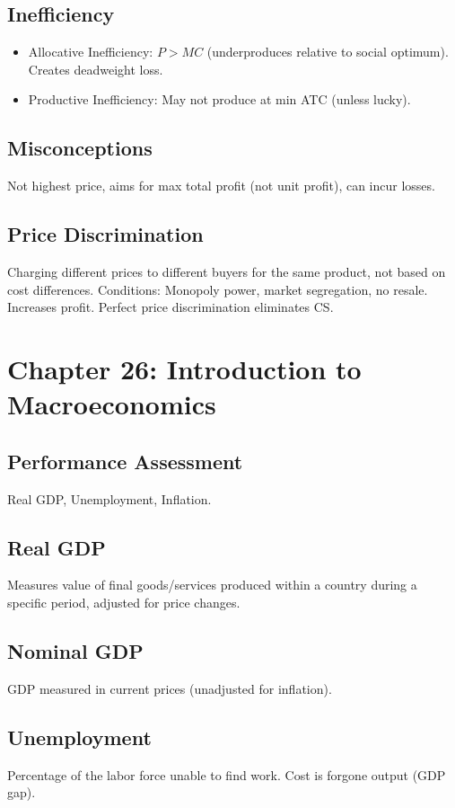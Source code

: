 \documentclass{article}
\begin{document}
\subsection*{Inefficiency}
\begin{itemize}
    \item Allocative Inefficiency: $P > MC$ (underproduces relative to social optimum). Creates deadweight loss.
    \item Productive Inefficiency: May not produce at min ATC (unless lucky).
\end{itemize}

\subsection*{Misconceptions}
Not highest price, aims for max total profit (not unit profit), can incur losses.

\subsection*{Price Discrimination}
Charging different prices to different buyers for the same product, not based on cost differences. Conditions: Monopoly power, market segregation, no resale. Increases profit. Perfect price discrimination eliminates CS.

\section*{Chapter 26: Introduction to Macroeconomics}

\subsection*{Performance Assessment}
Real GDP, Unemployment, Inflation.

\subsection*{Real GDP}
Measures value of final goods/services produced within a country during a specific period, adjusted for price changes.

\subsection*{Nominal GDP}
GDP measured in current prices (unadjusted for inflation).

\subsection*{Unemployment}
Percentage of the labor force unable to find work. Cost is forgone output (GDP gap).
\end{document}
